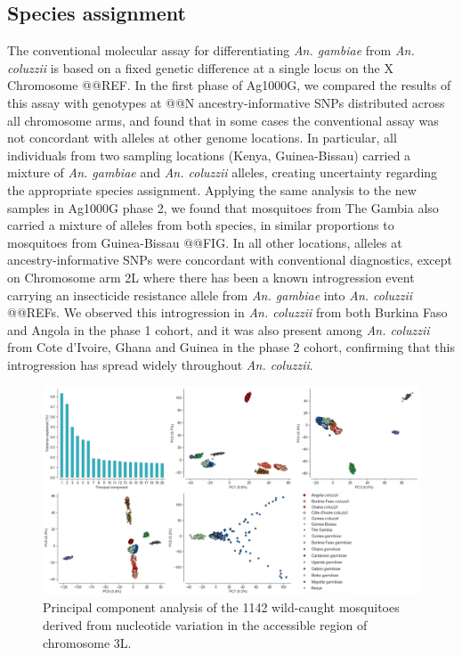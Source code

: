 \documentclass[a4paper,11pt,abstracton,hidelinks]{scrartcl}
\begin{document}
\subsection*{Species assignment}


%
The conventional molecular assay for differentiating \textit{An. gambiae} from \textit{An. coluzzii} is based on a fixed genetic difference at a single locus on the X Chromosome @@REF.
%
In the first phase of Ag1000G, we compared the results of this assay with genotypes at @@N ancestry-informative SNPs distributed across all chromosome arms, and found that in some cases the conventional assay was not concordant with alleles at other genome locations.
%
In particular, all individuals from two sampling locations (Kenya, Guinea-Bissau) carried a mixture of \textit{An. gambiae} and \textit{An. coluzzii} alleles, creating uncertainty regarding the appropriate species assignment. 
%
Applying the same analysis to the new samples in Ag1000G phase 2, we found that mosquitoes from The Gambia also carried a mixture of alleles from both species, in similar proportions to mosquitoes from Guinea-Bissau @@FIG.
%
In all other locations, alleles at ancestry-informative SNPs were concordant with conventional diagnostics, except on Chromosome arm 2L where there has been a known introgression event carrying an insecticide resistance allele from \textit{An. gambiae} into \textit{An. coluzzii} @@REFs.
%
We observed this introgression in \textit{An. coluzzii} from both Burkina Faso and Angola in the phase 1 cohort, and it was also present among \textit{An. coluzzii} from Cote d'Ivoire, Ghana and Guinea in the phase 2 cohort, confirming that this introgression has spread widely throughout \textit{An. coluzzii}.


\begin{figure}[H]
	\begin{center}
		\includegraphics*[width=6.3in]{artwork/main_pca.jpeg}
	\end{center}
	\caption{Principal component analysis of the 1142 wild-caught mosquitoes derived from nucleotide variation in the accessible region of chromosome 3L.}
	\label{pca}
\end{figure}
\end{document}
